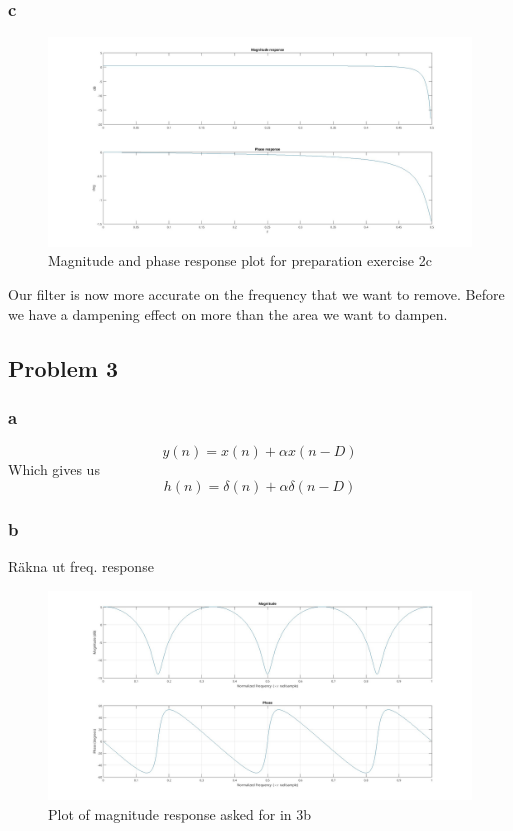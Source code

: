 \documentclass[a4paper,11pt]{article}
\begin{document}
\subsubsection{c}
\begin{figure}[H]
    \hspace{-40pt}\includegraphics[scale=0.28]{./images/prep-2c.jpg}
    \caption{Magnitude and phase response plot for preparation exercise 2c}
\end{figure}
Our filter is now more accurate on the frequency that we want to remove. Before we have a dampening effect on more than the area we want to dampen. 

\subsection{Problem 3}
\subsubsection{a}
\[
y(n) = x(n) + \alpha x(n-D)
\]
Which gives us
\[
h(n) = \delta(n) + \alpha\delta(n-D)
\]
\subsubsection{b}
Räkna ut freq. response
\begin{figure}[H]
    \hspace{-40pt}\includegraphics[scale=0.28]{./images/prep-3b.jpg}
    \caption{Plot of magnitude response asked for in 3b}
    \label{fig:my_label}
\end{figure}
\end{document}

